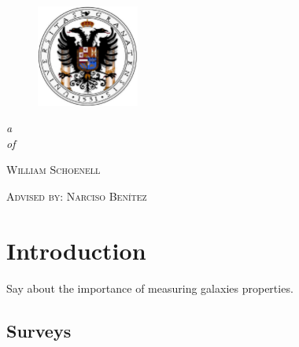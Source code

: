 \documentclass[9pt]{memoir}
\begin{document}
\frontmatter
\thispagestyle{empty}

\begin{figure}
	\vspace{-10pt}
	\begin{adjustwidth*}{-1in}{0pt}
		\centering
		\includegraphics[width=0.3\textwidth]{figures/Escudo_de_la_Universidad_de_Granada.pdf}
	\end{adjustwidth*}
	\vspace{-15pt}
\end{figure}


\begin{adjustwidth*}{-1in}{0pt}
	\centering
	 \par
	 \par
\end{adjustwidth*}

\mbox{}\vspace{1.8in}
\noindent
\begin{flushright}
{\LARGE\itshape{}a}\\[2\baselineskip]
{\LARGE\itshape{}of}
\end{flushright}

\vspace{6\baselineskip}
\hfill{\LARGE\scshape{}William Schoenell}

\vspace{1\baselineskip}
\hfill{\Large\scshape{}Advised by: Narciso Ben\'\i tez}


\cleartorecto\tableofcontents*

\mainmatter

\chapter{Introduction}
Say about the importance of measuring galaxies properties.

\section{Surveys}
\end{document}
